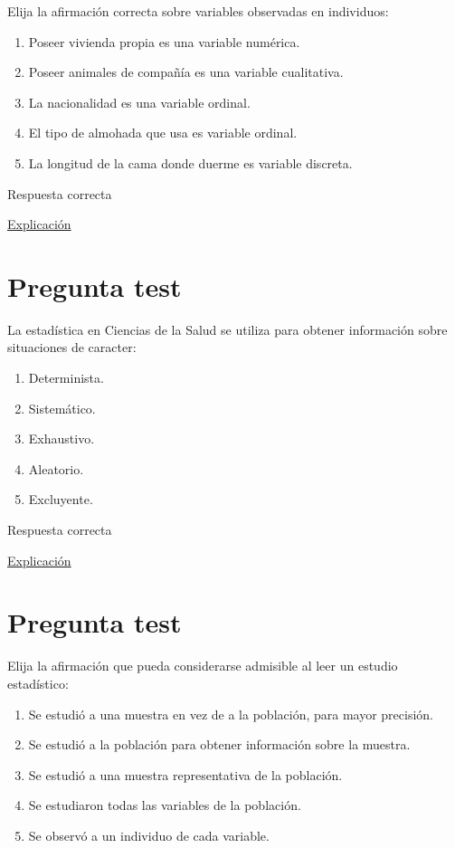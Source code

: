 \documentclass[
]{book}
\providecommand{\tightlist}{%
  \setlength{\itemsep}{0pt}\setlength{\parskip}{0pt}}
\begin{document}
Elija la afirmación correcta sobre variables observadas en individuos:

\begin{enumerate}
\def\labelenumi{\alph{enumi})}
\tightlist
\item
  Poseer vivienda propia es una variable numérica.
\item
  Poseer animales de compañía es una variable cualitativa.
\item
  La nacionalidad es una variable ordinal.
\item
  El tipo de almohada que usa es variable ordinal.
\item
  La longitud de la cama donde duerme es variable discreta.
\end{enumerate}

Respuesta correcta

\href{https://1fjmanzano.github.io/bioestadistica/tipos-de-variables.html}{Explicación}

\hypertarget{pregunta-test-18}{%
\section{Pregunta test}\label{pregunta-test-18}}

La estadística en Ciencias de la Salud se utiliza para obtener información sobre situaciones de caracter:

\begin{enumerate}
\def\labelenumi{\alph{enumi})}
\tightlist
\item
  Determinista.
\item
  Sistemático.
\item
  Exhaustivo.
\item
  Aleatorio.
\item
  Excluyente.
\end{enumerate}

Respuesta correcta

\href{https://1fjmanzano.github.io/bioestadistica/inferencia-estad\%C3\%ADstica.html}{Explicación}

\hypertarget{pregunta-test-19}{%
\section{Pregunta test}\label{pregunta-test-19}}

Elija la afirmación que pueda considerarse admisible al leer un estudio estadístico:

\begin{enumerate}
\def\labelenumi{\alph{enumi})}
\tightlist
\item
  Se estudió a una muestra en vez de a la población, para mayor precisión.
\item
  Se estudió a la población para obtener información sobre la muestra.
\item
  Se estudió a una muestra representativa de la población.
\item
  Se estudiaron todas las variables de la población.
\item
  Se observó a un individuo de cada variable.
\end{enumerate}
\end{document}
